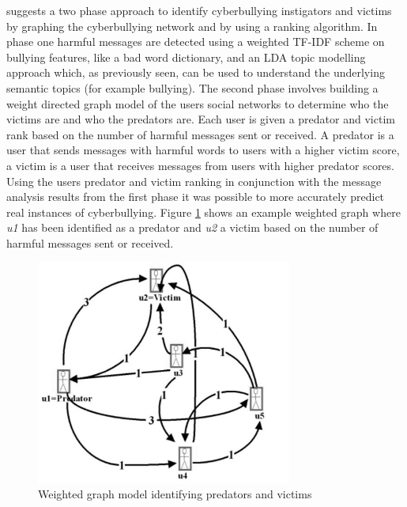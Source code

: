 \citet{nahar_effective_2013} suggests a two phase approach  to identify cyberbullying instigators and victims by graphing the cyberbullying network and by using a ranking algorithm. In phase one harmful messages are detected using a weighted TF-IDF scheme on bullying features, like a bad word dictionary, and an LDA topic modelling approach which, as previously seen, can be used to understand the underlying semantic topics (for example bullying). The second phase involves building a weight directed graph model of the users social networks to determine who the victims are and who the predators are. Each user is given a predator and victim rank based on the number of harmful messages sent or received. A predator is a user that sends messages with harmful words to users with a higher victim score, a victim is a user that receives messages from users with higher predator scores. Using the users predator and victim ranking in conjunction with the message analysis results from the first phase it was possible to more accurately predict real instances of cyberbullying. Figure \ref{fig:nahar_effective_2013_01} shows an example weighted graph where \textit{u1} has been identified as a predator and \textit{u2} a victim based on the number of harmful messages sent or received.

\begin{figure}[htbp]
	\centering
	\includegraphics[width=0.75\textwidth]{Figures/Chapter3/nahar_effective_2013_01.jpg}
	\caption[Weighted graph model identifying predators and victims]{Weighted graph model identifying predators and victims \citet{nahar_effective_2013}}
	\label{fig:nahar_effective_2013_01}
\end{figure}

